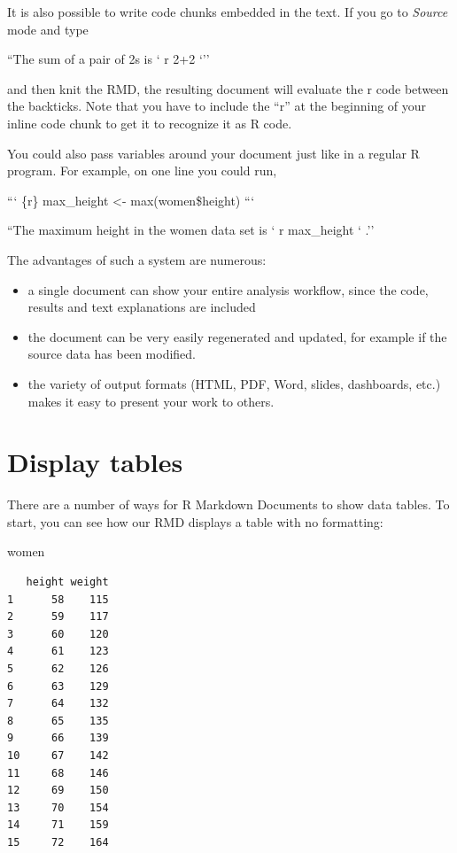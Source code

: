 \documentclass[
  letterpaper,
  DIV=11,
  numbers=noendperiod]{scrreprt}
\newenvironment{Shaded}{\begin{snugshade}}{\end{snugshade}}
\newcommand{\NormalTok}[1]{\textcolor[rgb]{0.00,0.23,0.31}{#1}}
\begin{document}
It is also possible to write code chunks embedded in the text. If you go
to \emph{Source} mode and type

``The sum of a pair of 2s is ` r 2+2 `''

and then knit the RMD, the resulting document will evaluate the r code
between the backticks. Note that you have to include the ``r'' at the
beginning of your inline code chunk to get it to recognize it as R code.

You could also pass variables around your document just like in a
regular R program. For example, on one line you could run,

``` \{r\} max\_height \textless- max(women\$height) ```

``The maximum height in the women data set is ` r max\_height ` .''

The advantages of such a system are numerous:

\begin{itemize}
\item
  a single document can show your entire analysis workflow, since the
  code, results and text explanations are included
\item
  the document can be very easily regenerated and updated, for example
  if the source data has been modified.
\item
  the variety of output formats (HTML, PDF, Word, slides, dashboards,
  etc.) makes it easy to present your work to others.
\end{itemize}

\hypertarget{display-tables}{%
\section{Display tables}\label{display-tables}}

There are a number of ways for R Markdown Documents to show data tables.
To start, you can see how our RMD displays a table with no formatting:

\begin{Shaded}
\begin{Highlighting}[]
\NormalTok{women}
\end{Highlighting}
\end{Shaded}

\begin{verbatim}
   height weight
1      58    115
2      59    117
3      60    120
4      61    123
5      62    126
6      63    129
7      64    132
8      65    135
9      66    139
10     67    142
11     68    146
12     69    150
13     70    154
14     71    159
15     72    164
\end{verbatim}
\end{document}
